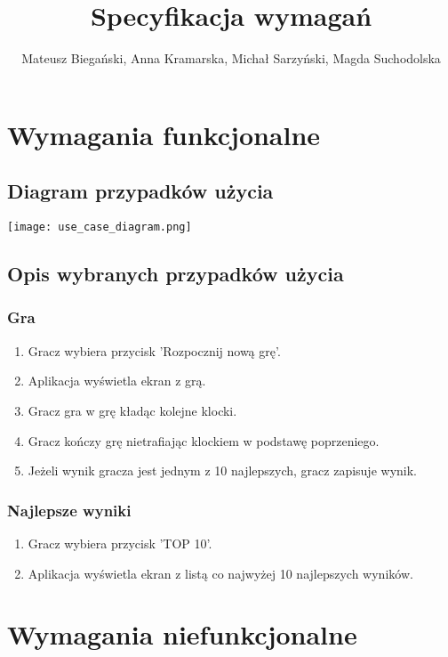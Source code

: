 \documentclass{article}
\begin{document}
\title{Specyfikacja wymagań}

\author{Mateusz Biegański, Anna Kramarska, Michał Sarzyński, Magda Suchodolska}
\maketitle

\section{Wymagania funkcjonalne}

\subsection{Diagram przypadków użycia}

\begin{center}
    \texttt{[image: use\_case\_diagram.png]}
\end{center}

\subsection{Opis wybranych przypadków użycia}

\subsubsection{Gra}

\begin{enumerate}
    \item Gracz wybiera przycisk 'Rozpocznij nową grę'.
    \item Aplikacja wyświetla ekran z grą.
    \item Gracz gra w grę kładąc kolejne klocki.
    \item Gracz kończy grę nietrafiając klockiem w podstawę poprzeniego.
    \item Jeżeli wynik gracza jest jednym z 10 najlepszych, gracz zapisuje wynik.
\end{enumerate}

\subsubsection{Najlepsze wyniki}
\begin{enumerate}
    \item Gracz wybiera przycisk 'TOP 10'.
    \item Aplikacja wyświetla ekran z listą co najwyżej 10 najlepszych wyników.
\end{enumerate}

\section{Wymagania niefunkcjonalne}
\end{document}
